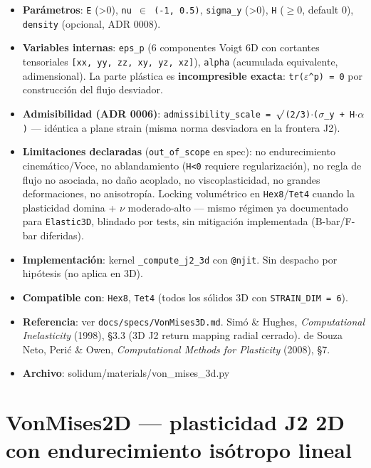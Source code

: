 \documentclass[11pt,letterpaper,oneside]{report}
\begin{document}
\begin{itemize}
  \item \textbf{Parámetros}: \texttt{E} (>0), \texttt{nu \ensuremath{\in} (-1, 0.5)}, \texttt{sigma\_y} (>0), \texttt{H} (\ensuremath{\ge}0, default 0), \texttt{density} (opcional, ADR 0008).
  \item \textbf{Variables internas}: \texttt{eps\_p} (6 componentes Voigt 6D con cortantes tensoriales \texttt{[xx, yy, zz, xy, yz, xz]}), \texttt{alpha} (acumulada equivalente, adimensional). La parte plástica es \textbf{incompresible exacta}: \texttt{tr(\ensuremath{\varepsilon}\textasciicircum{}p) = 0} por construcción del flujo desviador.
  \item \textbf{Admisibilidad (ADR 0006)}: \texttt{admissibility\_scale = \ensuremath{\surd}(2/3)\ensuremath{\cdot}(\ensuremath{\sigma}\_y + H\ensuremath{\cdot}\ensuremath{\alpha})} --- idéntica a plane strain (misma norma desviadora en la frontera J2).
  \item \textbf{Limitaciones declaradas} (\texttt{out\_of\_scope} en spec): no endurecimiento cinemático/Voce, no ablandamiento (\texttt{H<0} requiere regularización), no regla de flujo no asociada, no daño acoplado, no viscoplasticidad, no grandes deformaciones, no anisotropía. Locking volumétrico en \texttt{Hex8}/\texttt{Tet4} cuando la plasticidad domina + \texttt{\ensuremath{\nu}} moderado-alto --- mismo régimen ya documentado para \texttt{Elastic3D}, blindado por tests, sin mitigación implementada (B-bar/F-bar diferidas).
  \item \textbf{Implementación}: kernel \texttt{\_compute\_j2\_3d} con \texttt{@njit}. Sin despacho por hipótesis (no aplica en 3D).
  \item \textbf{Compatible con}: \texttt{Hex8}, \texttt{Tet4} (todos los sólidos 3D con \texttt{STRAIN\_DIM = 6}).
  \item \textbf{Referencia}: ver \texttt{docs/specs/VonMises3D.md}. Simó \& Hughes, \textit{Computational Inelasticity} (1998), §3.3 (3D J2 return mapping radial cerrado). de Souza Neto, Perić \& Owen, \textit{Computational Methods for Plasticity} (2008), §7.
  \item \textbf{Archivo}: solidum/materials/von\_mises\_3d.py
\end{itemize}


\section{VonMises2D --- plasticidad J2 2D con endurecimiento isótropo lineal}
\end{document}
